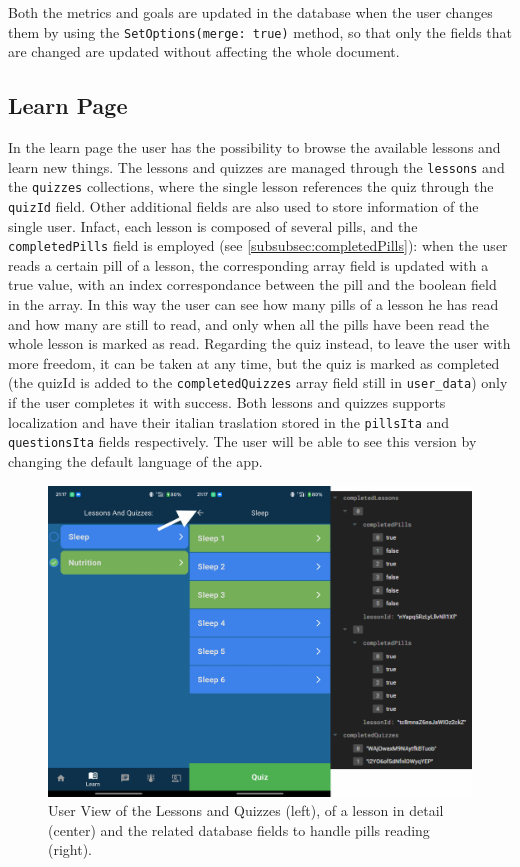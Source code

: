 \noindent Both the metrics and goals are updated in the database when the user changes them by using the \texttt{SetOptions(merge: true)} method, so that only the fields that are changed are updated without affecting the whole document.
\subsection{Learn Page}
In the learn page the user has the possibility to browse the available lessons and learn new things. The lessons and quizzes are managed through the \texttt{lessons} and the \texttt{quizzes} collections, where the single lesson references the quiz through the \texttt{quizId} field. Other additional fields are also used to store information of the single user. Infact, each lesson is composed of several pills, and the \texttt{completedPills} field is employed (see \cref{subsubsec:completedPills}): when the user reads a certain pill of a lesson, the corresponding array field is updated with a true value, with an index correspondance between the pill and the boolean field in the array. In this way the user can see how many pills of a lesson he has read and how many are still to read, and only when all the pills have been read the whole lesson is marked as read. Regarding the quiz instead, to leave the user with more freedom, it can be taken at any time, but the quiz is marked as completed (the quizId is added to the \texttt{completedQuizzes} array field still in \texttt{user\_data}) only if the user completes it with success. Both lessons and quizzes supports localization and have their italian traslation stored in the \texttt{pillsIta} and \texttt{questionsIta} fields respectively. The user will be able to see this version by changing the default language of the app.
\begin{figure}
    \centering
    \includegraphics[width=0.6\linewidth]{./images/lessonsQuizzes.jpg}
    \caption{User View of the Lessons and Quizzes (left), of a lesson in detail (center) and the related database fields to handle pills reading (right).}
\end{figure}

